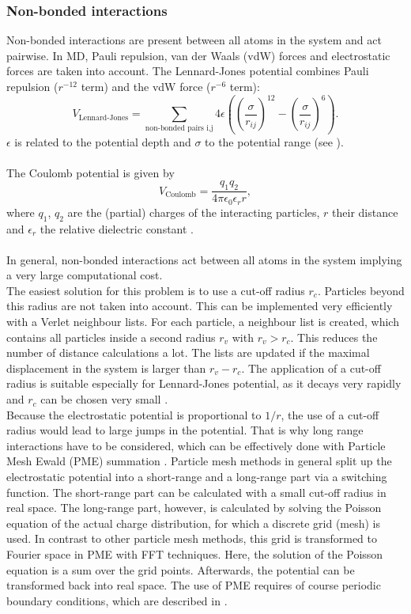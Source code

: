 \subsubsection{Non-bonded interactions}
Non-bonded interactions are present between all atoms in the system and act pairwise. In MD, Pauli repulsion, van der Waals (vdW) forces and electrostatic forces are taken into account.
The Lennard-Jones potential combines Pauli repulsion ($r^{-12}$ term) and the vdW force ($r^{-6}$ term):
\begin{equation}
V_\text{Lennard-Jones} = \sum_{\text{non-bonded pairs i,j}} 4 \epsilon\left(\left(\frac{\sigma}{r_{ij}}\right)^{12} - \left(\frac{\sigma}{r_{ij}}\right)^6\right).
\end{equation}
$\epsilon$ is related to the potential depth and $\sigma$ to the potential range (see ).\\
\\
The Coulomb potential is given by
\begin{equation}
V_\text{Coulomb} = \frac{q_1 q_2}{4 \pi \epsilon_0 \epsilon_r r},
\end{equation}
where $q_1$, $q_2$ are the (partial) charges of the interacting particles, $r$ their distance and $\epsilon_r$ the relative dielectric constant \autocite[p. 65-71]{gromacsManual}.\\
\\
In general, non-bonded interactions act between all atoms in the system implying a very large computational cost.\\
The easiest solution for this problem is to use a cut-off radius $r_c$. Particles beyond this radius are not taken into account. This can be implemented very efficiently with a Verlet neighbour lists. For each particle, a neighbour list is created, which contains all particles inside a second radius $r_v$ with $r_v > r_c$. This reduces the number of distance calculations a lot. The lists are updated if the maximal displacement in the system is larger than $r_v - r_c$.  The application of a cut-off radius is suitable especially for Lennard-Jones potential, as it decays very rapidly and $r_c$ can be chosen very small \autocite[p. 144]{greenBook}.\\
Because the electrostatic potential is proportional to $1/r$, the use of a cut-off radius would lead to large jumps in the potential. That is why long range interactions have to be considered, which can be effectively done with Particle Mesh Ewald (PME) summation \autocite{pme}. Particle mesh methods in general split up the electrostatic potential into a short-range and a long-range part via a switching function. The short-range part can be calculated with a small cut-off radius in real space. The long-range part, however, is calculated by solving the Poisson equation of the actual charge distribution, for which a discrete grid (mesh) is used. In contrast to other particle mesh methods, this grid is transformed to Fourier space in PME with FFT techniques. Here, the solution of the Poisson equation is a sum over the grid points. Afterwards, the potential can be transformed back into real space. The use of PME requires of course periodic boundary conditions, which are described in  \autocite[p. 246-251]{greenBook}.
